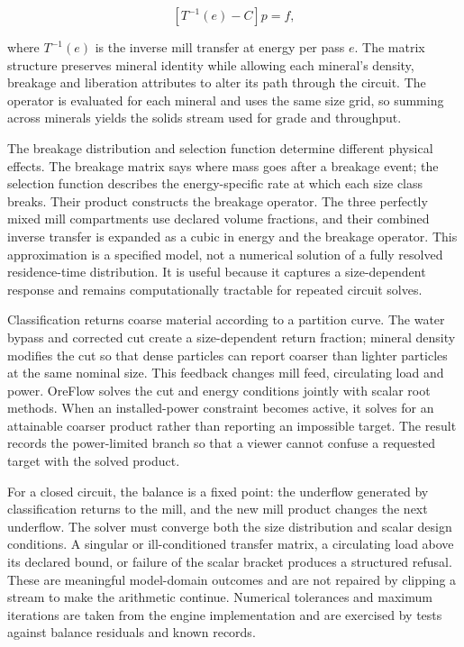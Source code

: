 \documentclass[10pt]{article}
\begin{document}
\[\left[T^{-1}(e)-C\right]p=f,\]

where \(T^{-1}(e)\) is the inverse mill transfer at energy per pass
\(e\). The matrix structure preserves mineral identity while allowing
each mineral's density, breakage and liberation attributes to alter its
path through the circuit. The operator is evaluated for each mineral and
uses the same size grid, so summing across minerals yields the solids
stream used for grade and throughput.

The breakage distribution and selection function determine different
physical effects. The breakage matrix says where mass goes after a
breakage event; the selection function describes the energy-specific
rate at which each size class breaks. Their product constructs the
breakage operator. The three perfectly mixed mill compartments use
declared volume fractions, and their combined inverse transfer is
expanded as a cubic in energy and the breakage operator. This
approximation is a specified model, not a numerical solution of a fully
resolved residence-time distribution. It is useful because it captures a
size-dependent response and remains computationally tractable for
repeated circuit solves.

Classification returns coarse material according to a partition curve.
The water bypass and corrected cut create a size-dependent return
fraction; mineral density modifies the cut so that dense particles can
report coarser than lighter particles at the same nominal size. This
feedback changes mill feed, circulating load and power. OreFlow solves
the cut and energy conditions jointly with scalar root methods. When an
installed-power constraint becomes active, it solves for an attainable
coarser product rather than reporting an impossible target. The result
records the power-limited branch so that a viewer cannot confuse a
requested target with the solved product.

For a closed circuit, the balance is a fixed point: the underflow
generated by classification returns to the mill, and the new mill
product changes the next underflow. The solver must converge both the
size distribution and scalar design conditions. A singular or
ill-conditioned transfer matrix, a circulating load above its declared
bound, or failure of the scalar bracket produces a structured refusal.
These are meaningful model-domain outcomes and are not repaired by
clipping a stream to make the arithmetic continue. Numerical tolerances
and maximum iterations are taken from the engine implementation and are
exercised by tests against balance residuals and known records.
\end{document}
